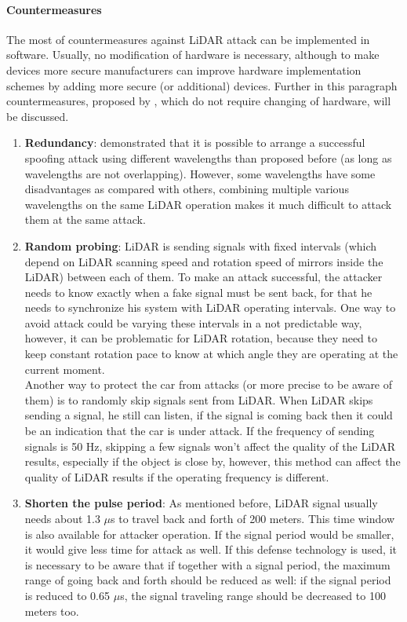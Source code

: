 \paragraph{Countermeasures}
The most of countermeasures against \gls{LiDAR} attack can be implemented in software. Usually, no modification of hardware is necessary, although to make devices more secure manufacturers can improve hardware implementation schemes by adding more secure (or additional) devices. Further in this paragraph countermeasures, proposed by \cite{AttacksOnSensors}, which do not require changing of hardware, will be discussed.
\begin{enumerate}
	\item \textbf{Redundancy}: \cite{diffWaveLenght} demonstrated that it is possible to arrange a successful spoofing attack using different wavelengths than proposed before (as long as wavelengths are not overlapping). However, some wavelengths have some disadvantages as compared with others, combining multiple various wavelengths on the same \gls{LiDAR} operation makes it much difficult to attack them at the same attack.
	\item \textbf{Random probing}: \gls{LiDAR} is sending signals with fixed intervals (which depend on \gls{LiDAR} scanning speed and rotation speed of mirrors inside the \gls{LiDAR}) between each of them. To make an attack successful, the attacker needs to know exactly when a fake signal must be sent back, for that he needs to synchronize his system with \gls{LiDAR} operating intervals. One way to avoid attack could be varying these intervals in a not predictable way, however, it can be problematic for \gls{LiDAR} rotation, because they need to keep constant rotation pace to know at which angle they are operating at the current moment. \\
	Another way to protect the car from attacks (or more precise to be aware of them) is to randomly skip signals sent from \gls{LiDAR}. When \gls{LiDAR} skips sending a signal, he still can listen, if the signal is coming back then it could be an indication that the car is under attack. If the frequency of sending signals is 50 Hz, skipping a few signals won't affect the quality of the \gls{LiDAR} results, especially if the object is close by, however, this method can affect the quality of \gls{LiDAR} results if the operating frequency is different. 
	\item \textbf{Shorten the pulse period}: As mentioned before, \gls{LiDAR} signal usually needs about 1.3 $\mu$s to travel back and forth of 200 meters. This time window is also available for attacker operation.  If the signal period would be smaller, it would give less time for attack as well. If this defense technology is used, it is necessary to be aware that if together with a signal period, the maximum range of going back and forth should be reduced as well: if the signal period is reduced to 0.65 $\mu$s, the signal traveling range should be decreased to 100 meters too.
\end{enumerate}

